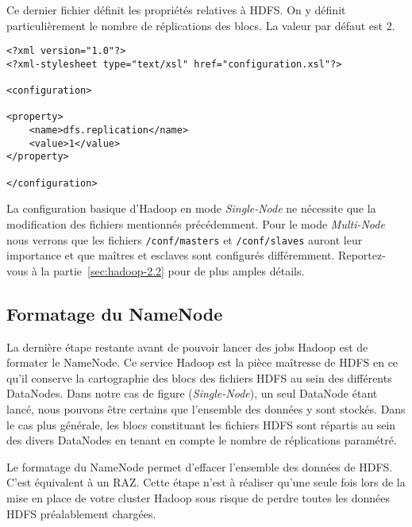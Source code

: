 \par Ce dernier fichier définit les propriétés relatives à HDFS. On y définit particulièrement le nombre de réplications des blocs. La valeur par défaut est 2.

\begin{verbatim}
<?xml version="1.0"?>
<?xml-stylesheet type="text/xsl" href="configuration.xsl"?>

<configuration>

<property>
	<name>dfs.replication</name>
	<value>1</value>
</property>

</configuration>
\end{verbatim}

\par La configuration basique d'Hadoop en mode \textit{Single-Node} ne nécessite que la modification des fichiers mentionnés précédemment. Pour le mode \textit{Multi-Node} nous verrons que les fichiers \texttt{/conf/masters} et \texttt{/conf/slaves} auront leur importance et que maîtres et esclaves sont configurés différemment. Reportez-vous à la partie~\ref{sec:hadoop-2.2} pour de plus amples détails.

\subsection{Formatage du NameNode}
\label{sec:format-nn}

\par La dernière étape restante avant de pouvoir lancer des jobs Hadoop est de formater le NameNode. Ce service Hadoop est la pièce maîtresse de HDFS en ce qu'il conserve la cartographie des blocs des fichiers HDFS au sein des différents DataNodes. Dans notre cas de figure (\textit{Single-Node}), un seul DataNode étant lancé, nous pouvons être certains que l'ensemble des données y sont stockés. Dans le cas plus générale, les blocs constituant les fichiers HDFS sont répartis au sein des divers DataNodes en tenant en compte le nombre de réplications paramétré.

\par Le formatage du NameNode permet d'effacer l'ensemble des données de HDFS. C'est équivalent à un RAZ. Cette étape n'est à réaliser qu'une seule fois lors de la mise en place de votre cluster Hadoop sous risque de perdre toutes les données HDFS préalablement chargées.

